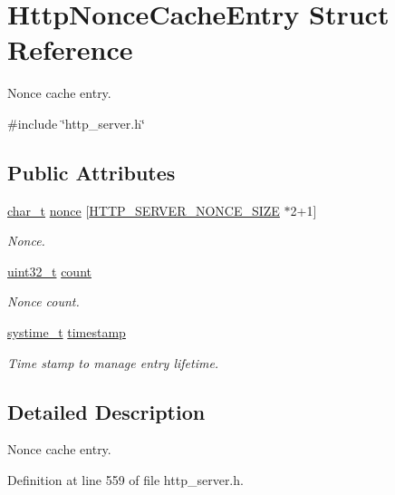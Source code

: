 \hypertarget{structHttpNonceCacheEntry}{}\section{Http\+Nonce\+Cache\+Entry Struct Reference}
\label{structHttpNonceCacheEntry}


Nonce cache entry.  




{\ttfamily \#include \char`\"{}http\+\_\+server.\+h\char`\"{}}

\subsection*{Public Attributes}
\begin{DoxyCompactItemize}
\item 
\hyperlink{compiler__port_8h_a40bb5262bf908c328fbcfbe5d29d0201}{char\+\_\+t} \hyperlink{structHttpNonceCacheEntry_a49cca6a1603b77d4d91b2b7f91db726b}{nonce} \mbox{[}\hyperlink{http__server_8h_abdefce676451bc1bf439d264f510abd7}{H\+T\+T\+P\+\_\+\+S\+E\+R\+V\+E\+R\+\_\+\+N\+O\+N\+C\+E\+\_\+\+S\+I\+ZE} $\ast$2+1\mbox{]}
\begin{DoxyCompactList}\small\item\em Nonce. \end{DoxyCompactList}\item 
\hyperlink{stdint_8h_a435d1572bf3f880d55459d9805097f62}{uint32\+\_\+t} \hyperlink{structHttpNonceCacheEntry_af4406b01e0c26184c5374d4287b6a07b}{count}
\begin{DoxyCompactList}\small\item\em Nonce count. \end{DoxyCompactList}\item 
\hyperlink{compiler__port_8h_ae3e32a98d431a02106616da3071832dd}{systime\+\_\+t} \hyperlink{structHttpNonceCacheEntry_aeb380011ddae3854b054d0a06ce7af97}{timestamp}
\begin{DoxyCompactList}\small\item\em Time stamp to manage entry lifetime. \end{DoxyCompactList}\end{DoxyCompactItemize}


\subsection{Detailed Description}
Nonce cache entry. 

Definition at line 559 of file http\+\_\+server.\+h.



